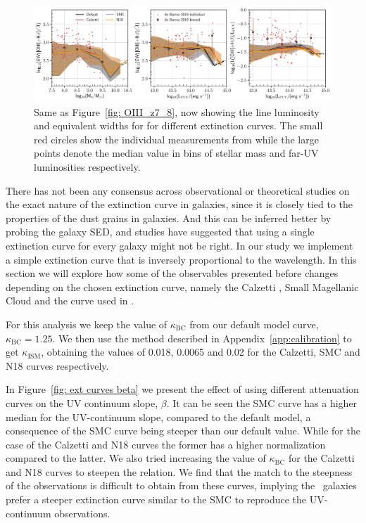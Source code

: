 \begin{figure}
	\centering
	\includegraphics[width=\textwidth]{./figures/App_EW_Extcurves}
	\caption{Same as Figure~\ref{fig: OIII_z7_8}, now showing the line luminosity and equivalent widths for for different extinction curves. The small red circles show the individual measurements from \protect\cite{deBarros19_OIIIHbeta} while the large points denote the median value in bins of stellar mass and far-UV luminosities respectively. \label{fig: ext curves EW}}
\end{figure}

There has not been any consensus across observational or theoretical studies on the exact nature of the extinction curve in galaxies, since it is closely tied to the properties of the dust grains in galaxies. And this can be inferred better by probing the galaxy SED, and studies have suggested that using a single extinction curve for every galaxy might not be right. In our study we implement a simple extinction curve that is inversely proportional to the wavelength. In this section we will explore how some of the observables presented before changes depending on the chosen extinction curve, namely the Calzetti \citep{Calzetti2000}, Small Magellanic Cloud \citep[SMC, ][]{Pei1992} and the curve used in \cite[][N18 from now on]{Narayanan2018}. 

For this analysis we keep the value of $\kappa_{\textrm{BC}}$ from our default model curve, \ie\, $\kappa_{\textrm{BC}}=1.25$. We then use the method described in Appendix~\ref{app:calibration} to get $\kappa_{\textrm{ISM}}$, obtaining the values of 0.018, 0.0065 and 0.02 for the Calzetti, SMC and N18 curves respectively.

In Figure~\ref{fig: ext curves beta} we present the effect of using different attenuation curves on the UV continuum slope, $\beta$. It can be seen the SMC curve has a higher median for the UV-continuum slope, compared to the default model, a consequence of the SMC curve being steeper than our default value. While for the case of the Calzetti and N18 curves the former has a higher normalization compared to the latter. We also tried increasing the value of $\kappa_{\textrm{BC}}$ for the Calzetti and N18 curves to steepen the relation. We find that the match to the steepness of the observations is difficult to obtain from these curves, implying the \flares\, galaxies prefer a steeper extinction curve similar to the SMC to reproduce the UV-continuum observations.

